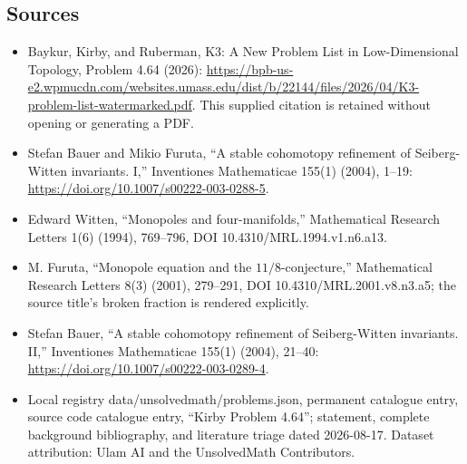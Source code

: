 \documentclass[11pt]{article}
\begin{document}
\subsection{Sources}
\begin{itemize}
\item Baykur, Kirby, and Ruberman, K3: A New Problem List in Low-Dimensional Topology, Problem 4.64 (2026): \url{https://bpb-us-e2.wpmucdn.com/websites.umass.edu/dist/b/22144/files/2026/04/K3-problem-list-watermarked.pdf}. This supplied citation is retained without opening or generating a PDF.
\item [BF04] Stefan Bauer and Mikio Furuta, ``A stable cohomotopy refinement of Seiberg-Witten invariants. I,'' Inventiones Mathematicae 155(1) (2004), 1--19: \url{https://doi.org/10.1007/s00222-003-0288-5}.
\item [Wit94] Edward Witten, ``Monopoles and four-manifolds,'' Mathematical Research Letters 1(6) (1994), 769--796, DOI 10.4310/MRL.1994.v1.n6.a13.
\item [Fur01] M. Furuta, ``Monopole equation and the $11/8$-conjecture,'' Mathematical Research Letters 8(3) (2001), 279--291, DOI 10.4310/MRL.2001.v8.n3.a5; the source title's broken fraction is rendered explicitly.
\item [Bau04] Stefan Bauer, ``A stable cohomotopy refinement of Seiberg-Witten invariants. II,'' Inventiones Mathematicae 155(1) (2004), 21--40: \url{https://doi.org/10.1007/s00222-003-0289-4}.
\item Local registry data/unsolvedmath/problems.json, permanent catalogue entry, source code catalogue entry, ``Kirby Problem 4.64''; statement, complete background bibliography, and literature triage dated 2026-08-17. Dataset attribution: Ulam AI and the UnsolvedMath Contributors.
\end{itemize}
\end{document}
